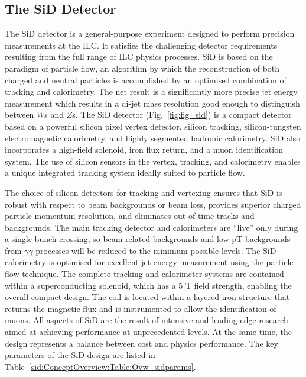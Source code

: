 \subsection{The SiD Detector}
The SiD detector is a general-purpose experiment designed to perform
 precision measurements
at the ILC. It satisfies the challenging detector requirements resulting from the full range of 
ILC physics processes. SiD is based on the paradigm of particle flow, an algorithm by which
the reconstruction of both charged and neutral particles is accomplished by an optimised
combination of tracking and calorimetry. The net result is a significantly more precise jet
energy measurement which results in a di-jet mass resolution good enough to distinguish
between $W$s and $Z$s.
The SiD detector (Fig.~\ref{fig:fig_sid})  is a compact detector based on a powerful silicon
pixel vertex detector, silicon tracking, silicon-tungsten electromagnetic calorimetry, and
highly segmented hadronic calorimetry. 
SiD also incorporates a high-field solenoid, iron
flux return, and a muon identification system. The use of silicon 
sensors in the vertex, tracking,
and calorimetry enables a unique integrated tracking system ideally suited to particle
flow.

The choice of silicon detectors for tracking and vertexing ensures that SiD is robust
with respect to beam backgrounds or beam loss, provides superior charged particle momentum
resolution, and eliminates out-of-time tracks and backgrounds. The main tracking
detector and calorimeters are “live” only during a single bunch crossing, so beam-related
backgrounds and low-pT backgrounds from $\gamma\gamma$ processes will be reduced to the minimum
possible levels. The SiD calorimetry is optimised for excellent jet energy measurement
using the particle flow technique.
 The complete tracking and calorimeter systems are contained
within a superconducting solenoid, which has a 5 T field strength, enabling the overall
compact design. The coil is located within a layered iron structure
that returns the magnetic flux and is instrumented to allow the
identification of muons. 
All aspects of SiD are the result of intensive and leading-edge research aimed at achieving
performance at unprecedented levels. At the same time, the design represents a balance between cost
and physics performance. The key parameters of the SiD design are
listed in  
Table~\ref{sid:ConceptOverview:Table:Ovw_sidparams}.

